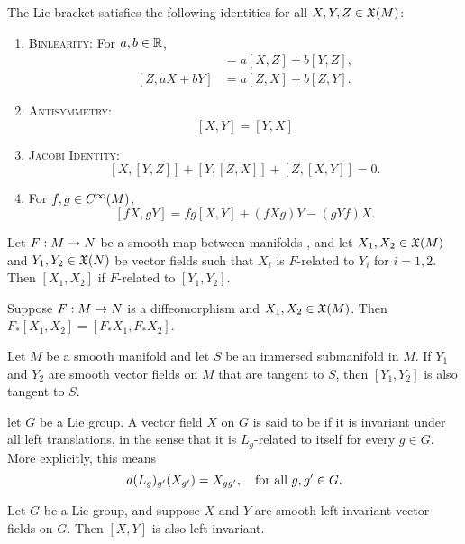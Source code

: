 \setcounter{thm}{27}

\begin{prop}
The Lie bracket satisfies the following identities for all $X,Y,Z\in \mathfrak{X}(M)$:
\begin{enumerate}
    \item {\scshape Binlearity:} For $a,b\in \mathbb{R}$,
    \begin{align*}
        [aX + bY, Z] &= a[X,Z] + b[Y,Z],\\
        [Z, aX + bY] &= a[Z,X] + b[Z,Y].
    \end{align*}
    \item {\scshape Antisymmetry:}
    \[[X,Y] = [Y,X]\]
    \item {\scshape Jacobi Identity:}
    \[[X,[Y,Z]] + [Y,[Z,X]] + [Z,[X,Y]] = 0.\]
    \item For $f,g\in C^\infty(M)$,
    \[[fX,gY] = fg [X,Y] + (fXg)Y - (gYf)X.\]
\end{enumerate}
\end{prop}

\setcounter{thm}{29}

\begin{prop}
Let $F:M\rightarrow N$ be a smooth map between manifolds \wowob, and let $X_1,X_2\in \mathfrak{X}(M)$ and $Y_1,Y_2\in \mathfrak{X}(N)$ be vector fields such that $X_i$ is $F$-related to $Y_i$ for $i = 1,2$. Then $[X_1,X_2]$ if $F$-related to $[Y_1,Y_2]$.
\end{prop}

\begin{cor}
Suppose $F:M\rightarrow N$ is a diffeomorphism and $X_1,X_2\in \mathfrak{X}(M)$. Then $F_*[X_1,X_2] = [F_*X_1,F_*X_2]$.
\end{cor}

\begin{cor}
Let $M$ be a smooth manifold and let $S$ be an immersed submanifold \wowob in $M$. If $Y_1$ and $Y_2$ are smooth vector fields on $M$ that are tangent to $S$, then $[Y_1,Y_2]$ is also tangent to $S$.
\end{cor}

\dfn let $G$ be a Lie group. A vector field $X$ on $G$ is said to be  if it is invariant under all left translations, in the sense that it is $L_g$-related to itself for every $g\in G$. More explicitly, this means
\[d(L_g)_{g^\prime}(X_{g^\prime}) = X_{gg^\prime},\quad\text{for all }g,g^\prime\in G.\]

\begin{prop}
Let $G$ be a Lie group, and suppose $X$ and $Y$ are smooth left-invariant vector fields on $G$. Then $[X,Y]$ is also left-invariant.
\end{prop}

